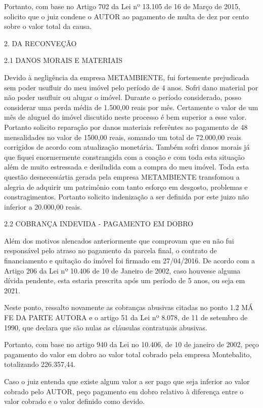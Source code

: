\documentclass[11pt]{letter}
\begin{document}
Portanto, com base no Artigo 702 da Lei nº 13.105 de 16 de Março de 2015, solicito que o juiz condene o AUTOR ao pagamento de multa de dez por cento sobre o valor total da causa.

2. DA RECONVEÇÃO

2.1 DANOS MORAIS E MATERIAIS 
 
Devido à negligência da empresa METAMBIENTE, fui fortemente prejudicada sem poder usufluir do meu imóvel pelo período de 4 anos. Sofri dano material por não poder usufluir ou alugar o imóvel. Durante o período considerado, posso considerar uma perda média de 1.500,00 reais por mês. Certamente o valor de um mês de aluguel do imóvel discutido neste processo é bem superior a esse valor. Portanto solicito reparação por danos materiais referêntes ao pagamento de 48 mensalidades no valor de 1500,00 reais, somando um total de 72.000,00 reais corrigidos de acordo com atualização monetária. Também sofri danos morais já que fiquei enormermente constrangida com a coação e com toda esta situação além de muito estressada e desiludida com a compra do meu imóvel. Toda esta questão desnecessártia gerada pela empresa METAMBIENTE transfomou a alegria de adquirir um patrimônio com tanto esforço em desgosto, problemas e constragimentos. Portanto solicito indenização a ser definida por este juizo não inferior a 20.000,00 reais. 

2.2 COBRANÇA INDEVIDA - PAGAMENTO EM DOBRO

Além dos motivos alencados anteriormente que comprovam que eu não fui responsável pelo atraso no pagamento da parcela final, o contrato de financiamento e quitação do imóvel foi firmado em 27/04/2016. De acordo com a Artigo 206 da Lei nº 10.406 de 10 de Janeiro de 2002, caso houvesse alguma dívida pendente, esta estaria prescrita após um período de 5 anos, ou seja em 2021.

Neste ponto, ressalto novamente as cobranças abusivas citadas no ponto 1.2 MÁ FE DA PARTE AUTORA e o artigo 51 da Lei nº 8.078, de 11 de setembro de 1990, que declara que são nulas as cláusulas contratuais abusivas. 

Portanto, com base no artigo 940 da Lei no 10.406, de 10 de janeiro de 2002, peço pagamento do valor em dobro ao valor total cobrado pela empresa Montebalito, totalizando 226.357,44.

Caso o juiz entenda que existe algum valor a ser pago que seja inferior ao valor cobrado pelo AUTOR, peço pagamento em dobro relativo à diferença entre o valor cobrado e o valor definido como devido. 
\end{document}
